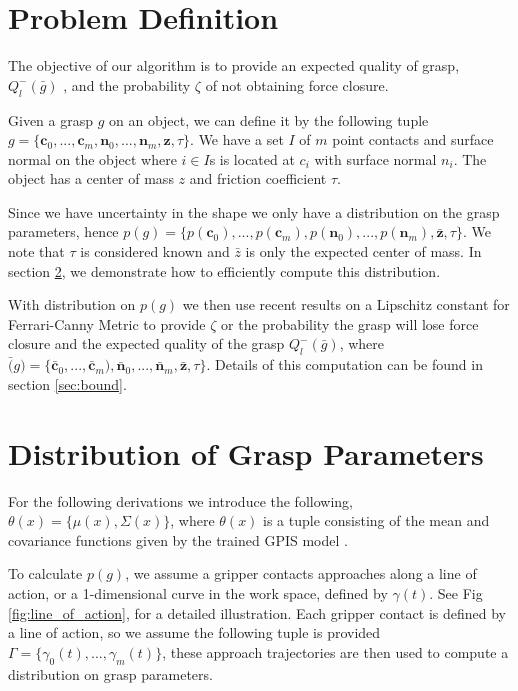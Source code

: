 \documentclass[letterpaper, 10 pt, conference]{ieeeconf}  %
\begin{document}

\section{Problem Definition}

The objective of our algorithm is to provide an expected quality of grasp, $Q_l^-(\bar{g})$ \cite{ferrari1992}, and the probability $\zeta$ of not obtaining force closure. 

Given a grasp $g$ on an object, we can define it by the following tuple $g = \lbrace \textbf{c}_0,...,\textbf{c}_m,\textbf{n}_0,...,\textbf{n}_m,\textbf{z},\tau\rbrace$. We have a set $I$ of $m$  point contacts and surface normal on the object where $i \in I$s is located at $c_i$ with surface normal $n_i$. The object has a center of mass $z$ and friction coefficient $\tau$.

Since we have uncertainty in the shape we only have a distribution on the grasp parameters, hence $p(g) = \lbrace p(\textbf{c}_0),...,p(\textbf{c}_m),p(\textbf{n}_0),...,p(\textbf{n}_m),\bar{\textbf{z}},\tau \rbrace$. We note that $\tau$ is considered known and $\bar{z}$ is only the expected center of mass. In section \ref{sec:distgrasp}, we demonstrate how to efficiently compute this distribution. 

With distribution on $p(g)$ we then use recent results on a Lipschitz constant for Ferrari-Canny Metric \cite{pokorny2013classical} to provide $\zeta$ or the probability the grasp will lose force closure and the expected quality of the grasp $Q_l^-(\bar{g})$, where $\bar(g) = \lbrace \bar{\textbf{c}}_0,...,\bar{\textbf{c}}_m),\bar{\textbf{n}}_0,...,\bar{\textbf{n}}_m,\bar{\textbf{z}},\tau \rbrace$. Details of this computation can be found in section \ref{sec:bound}.

\section{Distribution of Grasp Parameters}
\label{sec:distgrasp}

 For the following derivations we introduce the following,
 $\theta(x) = \lbrace \mu(x),\Sigma(x) \rbrace$, where $\theta(x)$ is a tuple consisting of the mean and covariance functions given by the trained GPIS model \cite{rasmussen2006} . 
 
 To calculate $p(g)$, we assume a gripper contacts approaches along a line of action, or a 1-dimensional curve in the work space, defined by $\gamma(t)$. See Fig \ref{fig:line_of_action}, for a detailed illustration. Each gripper contact is defined by a line of action, so we assume the following tuple is provided $\Gamma = \lbrace \gamma_0(t),...,\gamma_m(t) \rbrace$, these approach trajectories are then used to compute a distribution on grasp parameters. 
 
\end{document}
